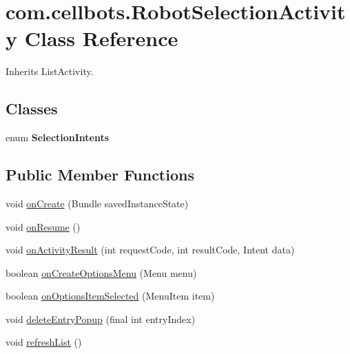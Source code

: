 \hypertarget{classcom_1_1cellbots_1_1_robot_selection_activity}{\section{com.\-cellbots.\-Robot\-Selection\-Activity Class Reference}
\label{classcom_1_1cellbots_1_1_robot_selection_activity}
}


Inherits List\-Activity.

\subsection*{Classes}
\begin{DoxyCompactItemize}
\item 
enum {\bfseries Selection\-Intents}
\end{DoxyCompactItemize}
\subsection*{Public Member Functions}
\begin{DoxyCompactItemize}
\item 
void \hyperlink{classcom_1_1cellbots_1_1_robot_selection_activity_a1037c2eb33bfc99a317f6b2e33b6bd55}{on\-Create} (Bundle saved\-Instance\-State)
\item 
void \hyperlink{classcom_1_1cellbots_1_1_robot_selection_activity_ac19f74203932167c0e502ba4dd342ac6}{on\-Resume} ()
\item 
void \hyperlink{classcom_1_1cellbots_1_1_robot_selection_activity_a6d41283cdbe753eec825aca06e7b212c}{on\-Activity\-Result} (int request\-Code, int result\-Code, Intent data)
\item 
boolean \hyperlink{classcom_1_1cellbots_1_1_robot_selection_activity_a33835d19396cbbfc5bd997224cd97344}{on\-Create\-Options\-Menu} (Menu menu)
\item 
boolean \hyperlink{classcom_1_1cellbots_1_1_robot_selection_activity_a9b49f450988571aba3fc573f4a874b8a}{on\-Options\-Item\-Selected} (Menu\-Item item)
\item 
void \hyperlink{classcom_1_1cellbots_1_1_robot_selection_activity_a5424a8ce03ae1aa8c4c5080d629f98d6}{delete\-Entry\-Popup} (final int entry\-Index)
\item 
void \hyperlink{classcom_1_1cellbots_1_1_robot_selection_activity_aa302811ac73fdf13569038288d234b4c}{refresh\-List} ()
\end{DoxyCompactItemize}
